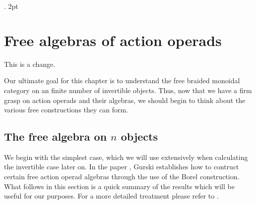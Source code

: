 \documentclass{amsart} %
\begin{document}
\newtheorem{thm}[equation]{Theorem}
\newtheorem{prop}[equation]{Proposition}
\newtheorem{lem}[equation]{Lemma}
\newtheorem{cor}[equation]{Corollary}

%
     {}%
     {}%
     {\bfseries}%
     {.}%
     {2pt}%
     {}%

   \theoremstyle{example}
   \newtheorem{nota}[equation]{Notation}
   \newtheorem{example}[equation]{Example}
   \newtheorem{defi}[equation]{Definition}
   \newtheorem{rem}[equation]{Remark}
	\newtheorem{comment}[equation]{Comment}

\tableofcontents

\section{Free algebras of action operads}

This is a change.

Our ultimate goal for this chapter is to understand the free braided monoidal category on an finite number of invertible objects. Thus, now that we have a firm grasp on action operads and their algebras, we should begin to think about the various free constructions they can form. 

\subsection{The free algebra on $n$ objects} 

We begin with the simplest case, which we will use extensively when calculating the invertible case later on. In the paper \cite{operadborel}, Gurski establishes how to contruct certain free action operad algebras through the use of the Borel construction. What follows in this section is a quick summary of the results which will be useful for our purposes. For a more detailed treatment please refer to \cite{operadborel}.
\end{document}
